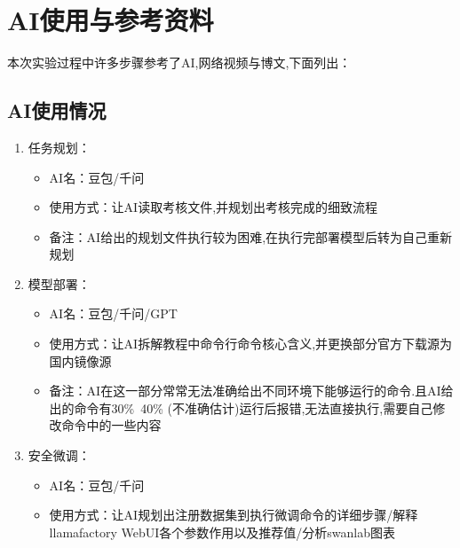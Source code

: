 \documentclass[12pt]{ctexart}
\begin{document}

\section{AI使用与参考资料}

本次实验过程中许多步骤参考了AI,网络视频与博文,下面列出：

\subsection{AI使用情况}

\begin{enumerate}
    \item 任务规划：

          \begin{itemize}

              \item AI名：豆包/千问

              \item 使用方式：让AI读取考核文件,并规划出考核完成的细致流程

              \item 备注：AI给出的规划文件执行较为困难,在执行完部署模型后转为自己重新规划

          \end{itemize}

    \item 模型部署：

          \begin{itemize}

              \item AI名：豆包/千问/GPT

              \item 使用方式：让AI拆解教程中命令行命令核心含义,并更换部分官方下载源为国内镜像源

              \item 备注：AI在这一部分常常无法准确给出不同环境下能够运行的命令.且AI给出的命令有30\%~40\% (不准确估计)运行后报错,无法直接执行,需要自己修改命令中的一些内容

          \end{itemize}

    \item 安全微调：

          \begin{itemize}
              \item AI名：豆包/千问

              \item 使用方式：让AI规划出注册数据集到执行微调命令的详细步骤/解释llamafactory WebUI各个参数作用以及推荐值/分析swanlab图表


\end{itemize}
\end{enumerate}
\end{document}
